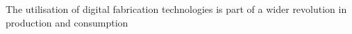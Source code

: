 The utilisation of digital fabrication technologies is part of a wider revolution in production and consumption